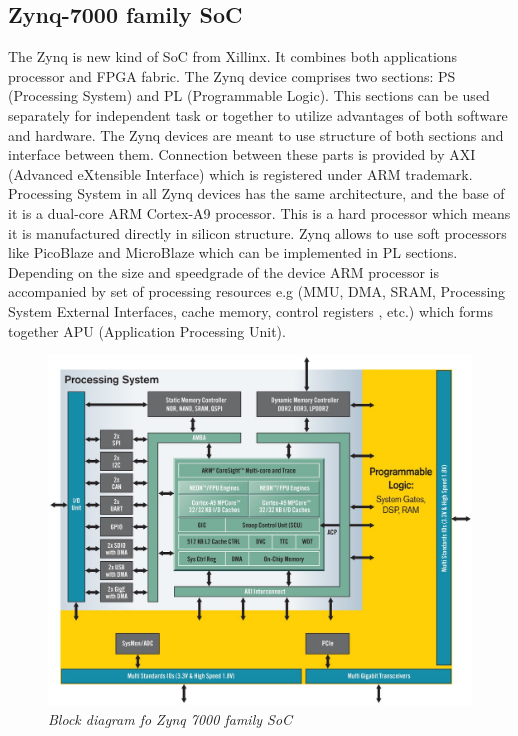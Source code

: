\documentclass[en,printmode]{mgr}
\begin{document}
		\subsection*{Zynq-7000 family SoC}
		The Zynq is new kind of SoC from Xillinx. It combines both applications processor and FPGA 	
		fabric. The Zynq device comprises two sections: PS (Processing System) and PL (Programmable
		Logic). This sections can be used separately for independent task or together to utilize
		advantages of both software and hardware. The Zynq devices are meant to use structure of
		both sections and interface between them. Connection between these parts is provided by AXI
		(Advanced eXtensible Interface) which is registered under ARM trademark.
		\\
		
		Processing System in all Zynq devices has the same architecture, and the base of it is
		a dual-core ARM Cortex-A9 processor. This is a hard processor which means it is manufactured 	        directly in silicon structure. Zynq allows to use soft processors like PicoBlaze and 
		MicroBlaze which can be implemented in PL sections. Depending on the size and speedgrade of
		the device ARM processor is accompanied by set of processing resources e.g (MMU, DMA, SRAM,
		Processing System External Interfaces, cache memory, control registers , etc.) which forms
		together APU (Application Processing Unit).
		
		\begin{figure}[!htb]
    		\centering
   			\includegraphics[width=\textwidth]{images/zynq.jpeg}
   		 	\caption{\textit{Block diagram fo Zynq 7000 family SoC}}
		\end{figure}
		\newpage
\end{document}

